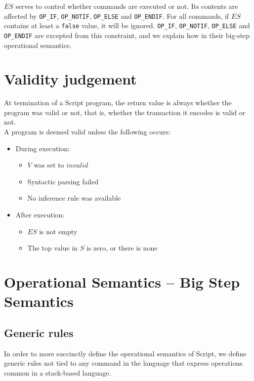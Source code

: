\documentclass{article}
\begin{document}
\noindent
$ES$ serves to control whether commands are executed or not. Its contents are affected by \texttt{OP\_IF}, \texttt{OP\_NOTIF}, \texttt{OP\_ELSE} and \texttt{OP\_ENDIF}. For all commands, if $ES$ contains at least a \texttt{false} value, it will be ignored. \texttt{OP\_IF}, \texttt{OP\_NOTIF}, \texttt{OP\_ELSE} and \texttt{OP\_ENDIF} are excepted from this constraint, and we explain how in their big-step operational semantics.

\section{Validity judgement}

At termination of a Script program, the return value is always whether the program was valid or not, that is, whether the transaction it encodes is valid or not.\\

\noindent
A program is deemed valid unless the following occurs:

\begin{itemize}
    \item During execution:
        \begin{itemize}
            \item $V$ was set to $invalid$
            \item Syntactic parsing failed
            \item No inference rule was available
        \end{itemize} 

    \item After execution:
        \begin{itemize}
            \item $ES$ is not empty
            \item The top value in $S$ is zero, or there is none
        \end{itemize} 
\end{itemize} \pagebreak


\hypertarget{OPSEM}{\section{Operational Semantics -- Big Step Semantics}}

\hypertarget{OPGEN}{\subsection{Generic rules}}
In order to more succinctly define the operational semantics of Script, we define generic rules not tied to any command in the language that express operations common in a stack-based language.
\end{document}
